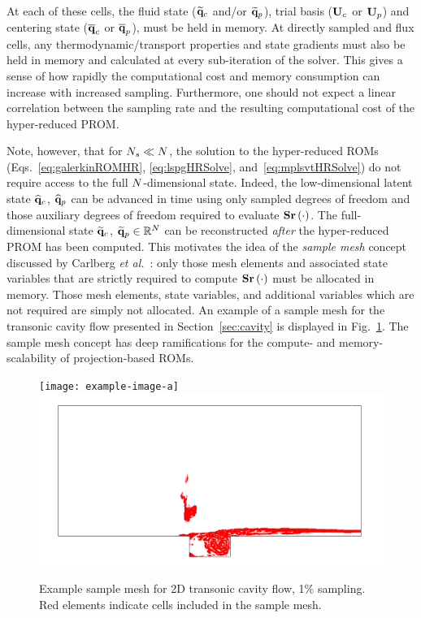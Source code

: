 At each of these cells, the fluid state ($\mathbf{\widetilde{q}}_{c}$ and/or $\mathbf{\widetilde{q}}_{p}$), trial basis ($\consTrial$ or $\primTrial$) and centering state ($\mathbf{\overline{q}}_{c}$ or $\mathbf{\overline{q}}_{p}$), must be held in memory. At directly sampled and flux cells, any thermodynamic/transport properties and state gradients must also be held in memory and calculated at every sub-iteration of the solver. This gives a sense of how rapidly the computational cost and memory consumption can increase with increased sampling. Furthermore, one should not expect a linear correlation between the sampling rate and the resulting computational cost of the hyper-reduced PROM.

Note, however, that for $N_s \ll N$, the solution to the hyper-reduced ROMs (Eqs.~\ref{eq:galerkinROMHR}, \ref{eq:lspgHRSolve}, and~\ref{eq:mplsvtHRSolve}) do not require access to the full $N$-dimensional state. Indeed, the low-dimensional latent state $\mathbf{\widehat{q}}_{c}$, $\mathbf{\widehat{q}}_{p}$ can be advanced in time using only sampled degrees of freedom and those auxiliary degrees of freedom required to evaluate $\mathbf{S} \mathbf{r}\left(\cdot\right)$. The full-dimensional state $\mathbf{\widetilde{q}}_{c}$, $\mathbf{\widetilde{q}}_{p} \in \mathbb{R}^{N}$ can be reconstructed \textit{after} the hyper-reduced PROM has been computed. This motivates the idea of the \textit{sample mesh} concept discussed by Carlberg \textit{et al.}~\cite{Carlberg2013}: only those mesh elements and associated state variables that are strictly required to compute $\mathbf{S} \mathbf{r}\left(\cdot\right)$ must be allocated in memory. Those mesh elements, state variables, and additional variables which are not required are simply not allocated. An example of a sample mesh for the transonic cavity flow presented in Section~\ref{sec:cavity} is displayed in Fig.~\ref{fig:sampMeshExample}. The sample mesh concept has deep ramifications for the compute- and memory-scalability of projection-based ROMs.

\begin{figure}
	\centering
	\ifdefined\DRAFT
		\texttt{[image: example-image-a]}
	\else
		\includegraphics[width=0.75\linewidth]{Chapters/HPROMs/Images/cavity_sample_mesh.png}
	\fi
	\caption{\label{fig:sampMeshExample}Example sample mesh for 2D transonic cavity flow, 1\% sampling. Red elements indicate cells included in the sample mesh.}
\end{figure}

